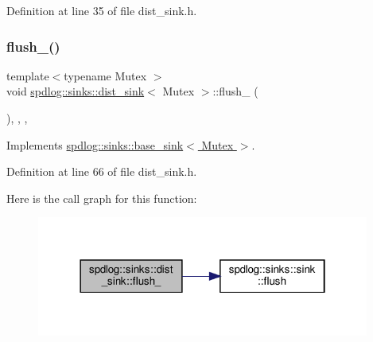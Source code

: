 Definition at line 35 of file dist\+\_\+sink.\+h.

\mbox{\label{classspdlog_1_1sinks_1_1dist__sink_a790a80f63276473cedbce99047adcab0}} 
\subsubsection{\texorpdfstring{flush\+\_\+()}{flush\_()}}
{\footnotesize\ttfamily template$<$typename Mutex $>$ \\
void \hyperlink{classspdlog_1_1sinks_1_1dist__sink}{spdlog\+::sinks\+::dist\+\_\+sink}$<$ Mutex $>$\+::flush\+\_\+ (\begin{DoxyParamCaption}{ }\end{DoxyParamCaption})\hspace{0.3cm}{\ttfamily [inline]}, {\ttfamily [override]}, {\ttfamily [protected]}, {\ttfamily [virtual]}}



Implements \hyperlink{classspdlog_1_1sinks_1_1base__sink_a5ac2b237c60f68a18122a1ca09b812b4}{spdlog\+::sinks\+::base\+\_\+sink$<$ Mutex $>$}.



Definition at line 66 of file dist\+\_\+sink.\+h.

Here is the call graph for this function\+:
\nopagebreak
\begin{figure}[H]
\begin{center}
\leavevmode
\includegraphics[width=310pt]{classspdlog_1_1sinks_1_1dist__sink_a790a80f63276473cedbce99047adcab0_cgraph}
\end{center}
\end{figure}
\mbox{\label{classspdlog_1_1sinks_1_1dist__sink_a6f91b5522c12fd448ca2fd7cb8fe0097}} 

